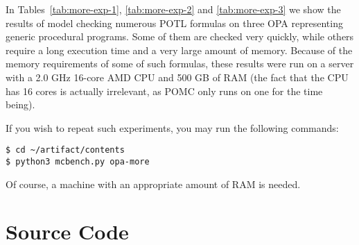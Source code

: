 \documentclass{article}
\begin{document}
In Tables~\ref{tab:more-exp-1}, \ref{tab:more-exp-2} and
\ref{tab:more-exp-3} we show the results of model checking numerous
POTL formulas on three OPA representing generic procedural programs.
Some of them are checked very quickly,
while others require a long execution time and a very large amount of
memory.  Because of the memory requirements of some of such formulas,
these results were run on a server with a 2.0 GHz 16-core AMD CPU and
500 GB of RAM (the fact that the CPU has 16 cores is actually
irrelevant, as POMC only runs on one for the time being).

If you wish to repeat such experiments, you may run the following
commands:
\begin{verbatim}
$ cd ~/artifact/contents
$ python3 mcbench.py opa-more
\end{verbatim}
Of course, a machine with an appropriate amount of RAM is needed.


\section{Source Code}
\label{sec:sources}
\end{document}
